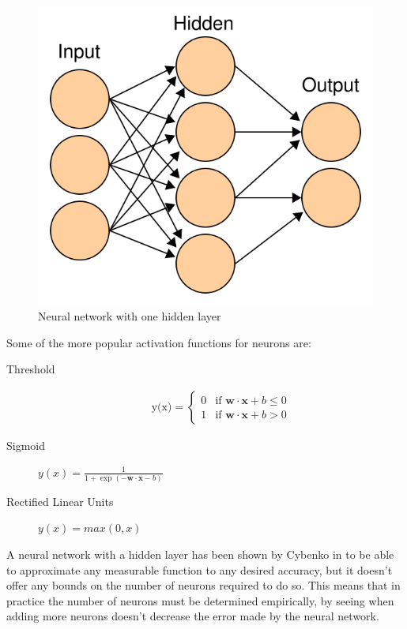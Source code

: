 \begin{figure}[h]
\begin{center}
\includegraphics[width=0.7\columnwidth]{img/artificial_neural_network.png}
\caption{
\label{fig:neural_network}
Neural network with one hidden layer \cite{neural_network}
}
\end{center}
\end{figure}

Some of the more popular activation functions for neurons are:

\begin{description}
\item[Threshold] \cite{rosenblatt1958perceptron} \begin{eqnarray}
  \mbox{y(x)} = \left\{ 
    \begin{array}{ll} 
      0 & \mbox{if } \mathbf{w}\cdot \mathbf{x} + b \leq 0 \\
      1 & \mbox{if } \mathbf{w}\cdot \mathbf{x} + b > 0
    \end{array}
  \right.
\end{eqnarray} 
\item[Sigmoid] $ y(x) = \frac{1}{1+\exp(-\mathbf{w} \cdot \mathbf{x} -b)} $ \cite{cybenko1989approximation}
\item[Rectified Linear Units] $ y(x) = max(0, x) $ \cite{nair2010rectified}
\end{description}

A neural network with a hidden layer has been shown by Cybenko in \cite{cybenko1989approximation} to be able to approximate any measurable function to any desired accuracy, but it doesn't offer any bounds on the number of neurons required to do so. This means that in practice the number of neurons must be determined empirically, by seeing when adding more neurons doesn't decrease the error made by the neural network. 


